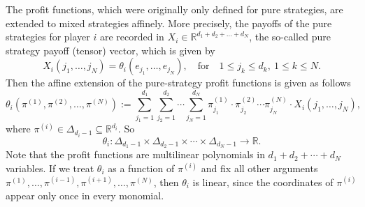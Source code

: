 \documentclass[a4paper,11pt,reqno,english]{amsart}
\theoremstyle{plain}
\theoremstyle{definition}
\begin{document}
\medskip
The profit functions, which were originally only defined for pure strategies, are extended to mixed strategies affinely.
More precisely, the payoffs of the pure strategies for player $i$ are recorded in $X_{i}\in\mathbb{R}^{d_1 + d_2 + \dots + d_N}$, the so-called pure strategy payoff (tensor) vector, which is given by
\begin{displaymath}
	X_{i}(j_1,\dots,j_N) = \theta_i(e_{j_1},\dots,e_{j_N}), \quad \text{for} \quad 1\leq j_k\leq d_k,\ 1\leq k\leq N.
\end{displaymath}
Then the affine extension of the pure-strategy profit functions is given as follows
\begin{equation}\label{eq:def:FiniteGameProfitFunction}
	\theta_i(\pi^{(1)}, \pi^{(2)}, \dots, \pi^{(N)}) := \sum_{j_1=1}^{d_1}\sum_{j_2=1}^{d_2}\cdots\sum_{j_N=1}^{d_N}\pi_{j_1}^{(1)}\cdot\pi_{j_2}^{(2)}\cdots\pi_{j_N}^{(N)}\cdot X_{i}(j_1,\dots,j_N),
\end{equation}
where $\pi^{(i)}\in\Delta_{d_i-1}\subseteq\mathbb{R}^{d_i}$. So
\begin{displaymath}
	\theta_i\colon \Delta_{d_1-1}\times \Delta_{d_2-1}\times\cdots\times\Delta_{d_N-1}\longrightarrow\mathbb{R}.
\end{displaymath}
Note that the profit functions are multilinear polynomials in $d_1 + d_2 + \cdots + d_N$ variables. If we treat $\theta_i$ as a function of $\pi^{(i)}$ and fix all other arguments $\pi^{(1)},\dots,\pi^{(i-1)},\pi^{(i+1)},\dots,\pi^{(N)}$, then $\theta_i$ is linear, since the coordinates of $\pi^{(i)}$ appear only once in every monomial.
\end{document}
